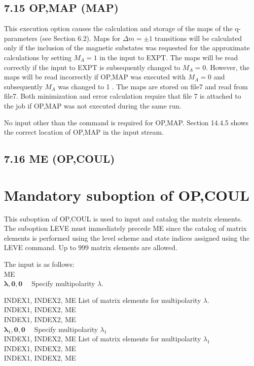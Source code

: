 \documentclass[10pt]{article}
\begin{document}
\subsection*{7.15 OP,MAP (MAP)}
This execution option causes the calculation and storage of the maps of the q-parameters (see Section 6.2). Maps for $\Delta m= \pm 1$ transitions will be calculated only if the inclusion of the magnetic substates was requested for the approximate calculations by setting $M_{A}=1$ in the input to EXPT. The maps will be read correctly if the input to EXPT is subsequently changed to $M_{A}=0$. However, the maps will be read incorrectly if OP,MAP was executed with $M_{A}=0$ and subsequently $M_{A}$ was changed to 1 . The maps are stored on file7 and read from file7. Both minimization and error calculation require that file 7 is attached to the job if OP,MAP was not executed during the same run.

No input other than the command is required for OP,MAP. Section 14.4.5 shows the correct location of OP,MAP in the input stream.

\subsection*{7.16 ME (OP,COUL)}
\section*{Mandatory suboption of OP,COUL}
This suboption of OP,COUL is used to input and catalog the matrix elements. The suboption LEVE must immediately precede ME since the catalog of matrix elements is performed using the level scheme and state indices assigned using the LEVE command. Up to 999 matrix elements are allowed.

The input is as follows:\\
ME\\
$\boldsymbol{\lambda}, \mathbf{0}, \mathbf{0} \quad$ Specify multipolarity $\lambda$.

INDEX1, INDEX2, ME List of matrix elements for multipolarity $\lambda$.\\
INDEX1, INDEX2, ME\\
INDEX1, INDEX2, ME\\
$\boldsymbol{\lambda}_{1}, \mathbf{0}, \mathbf{0} \quad$ Specify multipolarity $\lambda_{1}$\\
INDEX1, INDEX2, ME List of matrix elements for multipolarity $\lambda_{1}$\\
INDEX1, INDEX2, ME\\
INDEX1, INDEX2, ME
\end{document}

